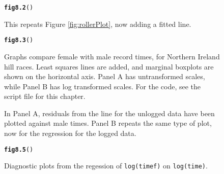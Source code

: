 \documentclass[12pt, a4paper,  BCOR=8.25mm, DIV=15]{scrartcl}\usepackage[]{graphicx}\usepackage[]{color}
\makeatletter
\newcommand{\hlstd}[1]{\textcolor[rgb]{0.345,0.345,0.345}{#1}}%
\newcommand{\hlkwd}[1]{\textcolor[rgb]{0.737,0.353,0.396}{\textbf{#1}}}%
\newenvironment{kframe}{%
 \def\at@end@of@kframe{}%
 \ifinner\ifhmode%
  \def\at@end@of@kframe{\end{minipage}}%
  \begin{minipage}{\columnwidth}%
 \fi\fi%
 \def\FrameCommand##1{\hskip\@totalleftmargin \hskip-\fboxsep
 \colorbox{shadecolor}{##1}\hskip-\fboxsep
     \hskip-\linewidth \hskip-\@totalleftmargin \hskip\columnwidth}%
 \MakeFramed {\advance\hsize-\width
   \@totalleftmargin\z@ \linewidth\hsize
   \@setminipage}}%
 {\par\unskip\endMakeFramed%
 \at@end@of@kframe}
\newenvironment{knitrout}{}{} %
\newcommand{\txtt}[1]{{\texttt{#1}}}
\makeatother
\begin{document}
\begin{figure}[H]
\begin{knitrout}
\color{fgcolor}\begin{kframe}
\begin{alltt}
\hlkwd{fig8.2}\hlstd{()}
\end{alltt}
\end{kframe}
\end{knitrout}
\caption{This repeats Figure \ref{fig:rollerPlot}, now adding a fitted
  line.}\label{fig:rollerPlot-withline}
\end{figure}

\begin{figure}[H]
\begin{knitrout}
\color{fgcolor}\begin{kframe}
\begin{alltt}
\hlkwd{fig8.3}\hlstd{()}
\end{alltt}
\end{kframe}
\end{knitrout}
  \caption{Graphs compare female with male record times, for Northern Ireland
  hill races. Least squares lines are added, and marginal boxplots are shown
  on the horizontal axis. Panel A has untransformed scales, while Panel B has
  log transformed scales. For the code, see the script file for this
  chapter.}\label{fig:nimff}
\end{figure}


\begin{figure}[H]

\caption{In Panel A, residuals from the line for the unlogged data
  have been plotted against male times.  Panel B repeats the same
  type of plot, now for the regression for the logged data.\label{fig:to-horiz}}
\end{figure}


\begin{figure}[H]
\begin{knitrout}
\color{fgcolor}\begin{kframe}
\begin{alltt}
\hlkwd{fig8.5}\hlstd{()}
\end{alltt}
\end{kframe}
\end{knitrout}
\caption{Diagnostic plots from the regession of \txtt{log(timef)} on
  \txtt{log(time)}.}\label{fig:diag-mftime}
\end{figure}
\end{document}
